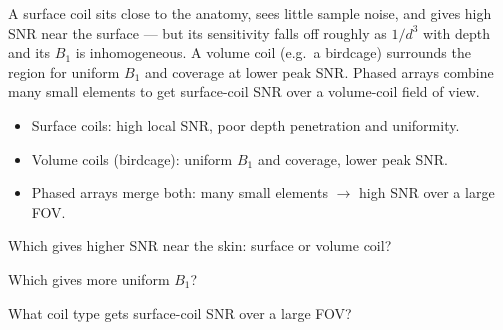 \begin{workedexample}
A surface coil sits close to the anatomy, sees little sample noise, and
gives high SNR near the surface --- but its sensitivity falls off roughly as
$1/d^3$ with depth and its $B_1$ is inhomogeneous. A volume coil (e.g.\ a
birdcage) surrounds the region for uniform $B_1$ and coverage at lower peak SNR.
Phased arrays combine many small elements to get surface-coil SNR over a
volume-coil field of view.
\end{workedexample}

\begin{keytakeaways}
\begin{itemize}[leftmargin=1.4em,itemsep=2pt]
\item Surface coils: high local SNR, poor depth penetration and uniformity.
\item Volume coils (birdcage): uniform $B_1$ and coverage, lower peak SNR.
\item Phased arrays merge both: many small elements $\to$ high SNR over a large FOV.
\end{itemize}
\end{keytakeaways}

\begin{exercises}
\item Which gives higher SNR near the skin: surface or volume coil?
\item Which gives more uniform $B_1$?
\item What coil type gets surface-coil SNR over a large FOV?
\end{exercises}

